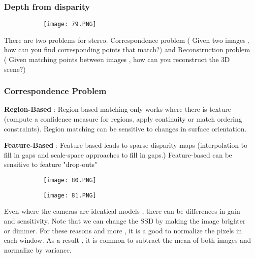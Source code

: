 \documentclass{article}
\begin{document}
\vspace{30mm}

\subsubsection{Depth from disparity}

\begin{figure}[ht!]
  \centering
  \begin{subfigure}[b]{0.4\linewidth}
    \texttt{[image: 79.PNG]}
  \end{subfigure}
\end{figure}

There are two problems for stereo. Correspondence problem ( Given two images , how can you find corresponding points that match?) and Reconstruction problem ( Given matching points between images , how can you reconstruct the 3D scene?)

\subsubsection{Correspondence Problem}

\textbf{Region-Based} : Region-based matching only works where there is texture (compute a confidence measure for regions, apply continuity or match ordering constraints).
Region matching can be sensitive to changes in surface orientation.

\textbf{Feature-Based} : Feature-based leads to sparse disparity maps (interpolation to fill in gaps and scale-space approaches to fill in gaps.)
Feature-based can be sensitive to feature "drop-outs"

\begin{figure}[ht!]
  \centering
  \begin{subfigure}[b]{0.4\linewidth}
    \texttt{[image: 80.PNG]}
  \end{subfigure}
  \begin{subfigure}[b]{0.4\textwidth}
         \centering
         \texttt{[image: 81.PNG]}
     \end{subfigure}
\end{figure}


Even where the cameras are identical models , there can be differences in gain and sensitivity. Note that we can change the SSD by making the image brighter or dimmer.
For these reasons and more , it is a good to normalize the pixels in each window.
As a result , it is common to subtract the mean of both images and normalize by variance.
\end{document}
